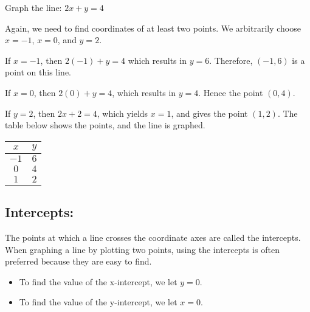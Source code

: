 \begin{example}
Graph the line: $2x + y = 4$
\end{example}

\begin{solution} Again, we need to find coordinates of at least two points. We arbitrarily choose $x = -1$, $x = 0$, and $y = 2$.

If $x = -1$, then $2(-1) + y = 4$ which results in $y = 6$. Therefore, $(-1, 6)$ is a point on this line.

If $x = 0$, then $2(0) + y = 4$, which results in $y = 4$. Hence the point $(0, 4)$.

If $y = 2$, then $2x + 2 = 4$, which yields $x = 1$, and gives the point $(1, 2)$. The table below shows the points, and the line is graphed.

\begin{center}
\begin{tabular}{c|c}
    $x$ & $y$ \\
    \hline
    $-1$ & $6$ \\
    $0$  & $4$ \\
    $1$  & $2$
\end{tabular}
\end{center}

\begin{center}
\end{center}


\end{solution}

\subsection{Intercepts:} The points at which a line crosses the coordinate axes are called the intercepts. When graphing a line by plotting two points, using the intercepts is often preferred because they are easy to find.
\begin{itemize}
    \item To find the value of the x-intercept, we let $y = 0$.
    \item To find the value of the y-intercept, we let $x = 0$.
\end{itemize}


